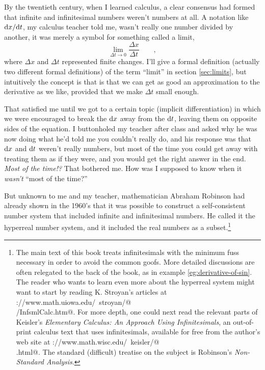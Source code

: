 By the twentieth century, when I learned calculus, a clear consensus had formed that infinite and infinitesimal
numbers weren't numbers at all. A notation like $\textup{d} x/\textup{d} t$, my calculus teacher told me, wasn't really
one number divided by another, it was merely a symbol for something called a limit,
\begin{equation*}
\lim_{\Delta t\rightarrow 0} \frac{\Delta x}{\Delta t} \qquad ,
\end{equation*}
where $\Delta x$ and $\Delta t$ represented finite changes. I'll give a formal definition (actually two different formal
definitions) of the term ``limit'' in section \ref{sec:limits}, but intuitively the concept is that is that we can get as good
an approximation to the derivative as we like, provided that we make $\Delta t$ small enough.

That satisfied me until we got to a certain topic
(implicit differentiation) in which we were encouraged to break the $\textup{d} x$ away from the $\textup{d} t$, leaving them on
opposite sides of the equation. I buttonholed my teacher after class and asked why he was now doing what he'd
told me you couldn't really do, and his response was that $\textup{d} x$ and $\textup{d} t$ weren't really numbers,
but most of the time you could get away with treating them as if they were, and you would get the right
answer in the end. \emph{Most of the time!?} That bothered me. How was I supposed to know when it \emph{wasn't}
``most of the time?''


But unknown to me and my teacher, mathematician Abraham Robinson
had already shown in the 1960's that it
was possible to construct a self-consistent number system that included infinite and infinitesimal numbers.
He called it the hyperreal number system,
and it included the real numbers as a subset.\footnote{The main text of this book treats infinitesimals
with the minimum fuss necessary in order to avoid the common goofs. More detailed
discussions are often relegated to the back of the book, as in example \ref{eg:derivative-of-sin}.
The reader who
wants to learn even more about the hyperreal system might want to start
by reading K. Stroyan's articles at 
\verb@http://www.math.uiowa.edu/~stroyan/@\\
\verb@InfsmlCalculus/InfsmlCalc.htm@.
For more depth, one could next read the relevant parts of Keisler's
\emph{Elementary Calculus: An Approach Using Infinitesimals}, an out-of-print calculus text that uses infinitesimals,
available for free from the author's web site at
\verb@http://www.math.wisc.edu/~keisler/@\\
\verb@calc.html@. The standard (difficult) treatise on the subject is Robinson's
\emph{Non-Standard Analysis}.}

